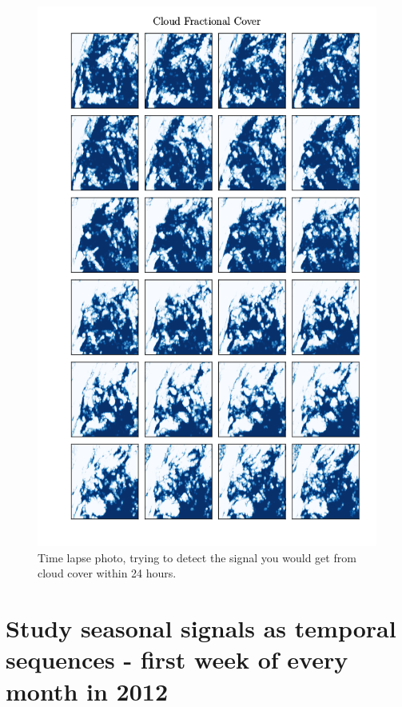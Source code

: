 \begin{figure}[ht]
    \centering
    \includegraphics{python_figs/timelapse_cloud_cover_24hrs_from_2010-07-01.png}
    \caption{Time lapse photo, trying to detect the signal you would get from cloud cover within 24 hours.}
    \label{fig:time_lapse}
\end{figure}



\chapter{Study seasonal signals as temporal sequences - first week of every month in 2012}

